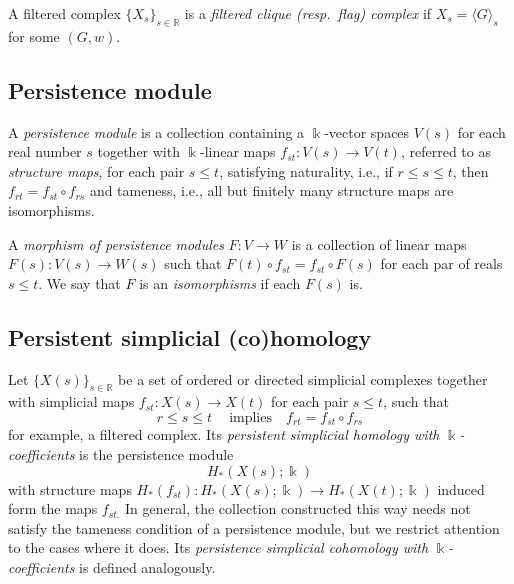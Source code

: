 \documentclass{amsart}
\begin{document}
	A filtered complex $\{X_s\}_{s \in \mathbb R}$ is a \textit{filtered clique (resp.\ flag) complex} if $X_s = \langle G \rangle_s$ for some $(G,w)$.
	
	\subsection*{Persistence module} \label{persistence_module}
	
	A \textit{persistence module} is a collection containing a $\Bbbk$-vector spaces $V(s)$ for each real number $s$ together with $\Bbbk$-linear maps $f_{st} : V(s) \to V(t)$, referred to as \textit{structure maps}, for each pair $s \leq t$, satisfying	naturality, i.e., if $r \leq s \leq t$, then $f_{rt} = f_{st} \circ f_{rs}$ and tameness, i.e., all but finitely many structure maps are isomorphisms.
	
	A \textit{morphism of persistence modules} $F : V \to W$ is a collection of linear maps $F(s) : V(s) \to W(s)$ such that $F(t) \circ f_{st} = f_{st} \circ F(s)$ for each par of reals $s \leq t$.	We say that $F$ is an \textit{isomorphisms} if each $F(s)$ is.
	
	\subsection*{Persistent simplicial (co)homology} \label{persistent_simplicial_(co)homology}
	
	Let $\{X(s)\}_{s \in \mathbb R} $ be a set of ordered or directed simplicial complexes together with simplicial maps $f_{st} : X(s) \to X(t)$ for each pair $s \leq t$, such that 
	\begin{equation*}
	r \leq s \leq t\ \quad\text{implies} \quad f_{rt} = f_{st} \circ f_{rs}
	\end{equation*}
	for example, a 
	filtered complex. Its \textit{persistent simplicial homology with} $\Bbbk$\textit{-coefficients} is the persistence module
	\begin{equation*}
	H_*(X(s); \Bbbk)
	\end{equation*}
	with structure maps $H_*(f_{st}) : H_*(X(s); \Bbbk) \to H_*(X(t); \Bbbk)$ induced form the maps $f_{st.}$ In general, the collection constructed this way needs not satisfy the tameness condition of a 
	persistence module, but we restrict attention to the cases where it does. Its \textit{persistence simplicial cohomology with} $\Bbbk$\textit{-coefficients} is defined analogously.
	
\end{document}
